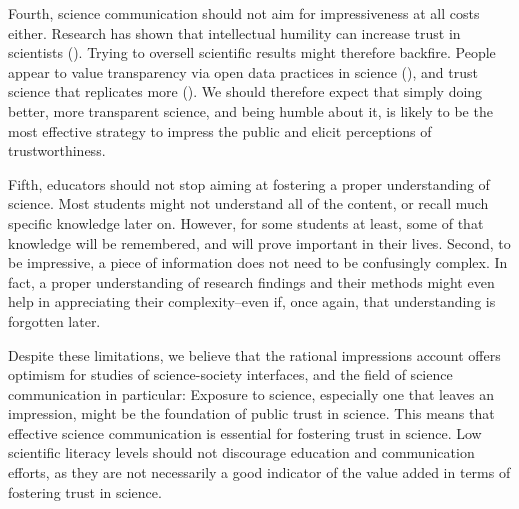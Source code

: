 \documentclass[
  jou,
  floatsintext,
  longtable,
  nolmodern,
  notxfonts,
  notimes,
  colorlinks=true,linkcolor=blue,citecolor=blue,urlcolor=blue]{apa7}
\begin{document}
Fourth, science communication should not aim for impressiveness at all
costs either. Research has shown that intellectual humility can increase
trust in scientists
().
Trying to oversell scientific results might therefore backfire. People
appear to value transparency via open data practices in science
(), and
trust science that replicates more
(). We should therefore expect that simply doing better, more
transparent science, and being humble about it, is likely to be the most
effective strategy to impress the public and elicit perceptions of
trustworthiness.

Fifth, educators should not stop aiming at fostering a proper
understanding of science. Most students might not understand all of the
content, or recall much specific knowledge later on. However, for some
students at least, some of that knowledge will be remembered, and will
prove important in their lives. Second, to be impressive, a piece of
information does not need to be confusingly complex. In fact, a proper
understanding of research findings and their methods might even help in
appreciating their complexity--even if, once again, that understanding
is forgotten later.

Despite these limitations, we believe that the rational impressions
account offers optimism for studies of science-society interfaces, and
the field of science communication in particular: Exposure to science,
especially one that leaves an impression, might be the foundation of
public trust in science. This means that effective science communication
is essential for fostering trust in science. Low scientific literacy
levels should not discourage education and communication efforts, as
they are not necessarily a good indicator of the value added in terms of
fostering trust in science.
\end{document}
